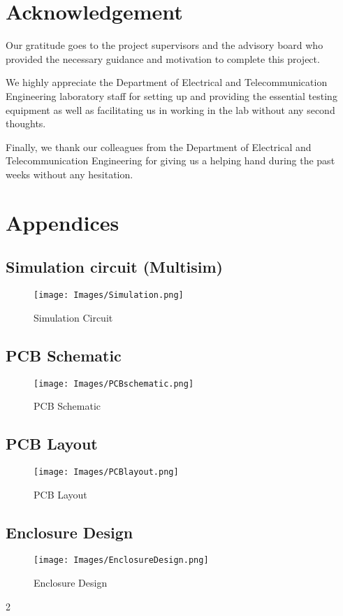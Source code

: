 \documentclass[11pt,a4paper]{article}
\begin{document}
\begin{multicols}{2}
\section{Acknowledgement }
Our gratitude goes to the project supervisors and the advisory board who provided the necessary guidance and motivation to complete this project.

We highly appreciate the Department of Electrical and Telecommunication Engineering laboratory staff for setting up and providing the essential testing equipment as well as facilitating us in working in the lab without any second thoughts.

Finally, we thank our colleagues from the Department of Electrical and Telecommunication Engineering for giving us a helping hand during the past weeks without any hesitation.

\newpage
\section{Appendices}
\subsection{Simulation circuit (Multisim) }

\begin{figure}[H]
    \centering
\texttt{[image: Images/Simulation.png]}
    \caption{Simulation Circuit}
    \label{fig:Simulation}
\end{figure}


\subsection{PCB Schematic }
\begin{figure}[H]
    \centering
    \texttt{[image: Images/PCBschematic.png]}
    \caption{PCB Schematic}
    \label{fig:PCBschematic}
\end{figure}

\subsection{PCB Layout}
\begin{figure}[H]
    \centering
    \texttt{[image: Images/PCBlayout.png]}
    \caption{PCB Layout}
    \label{fig:PCBlayout}
\end{figure}

\subsection{Enclosure Design}
\begin{figure}[H]
    \centering
    \texttt{[image: Images/EnclosureDesign.png]}
    \caption{Enclosure Design}
    \label{fig:EnclosureDesign}
\end{figure}

\end{multicols}{2}
\end{document}
